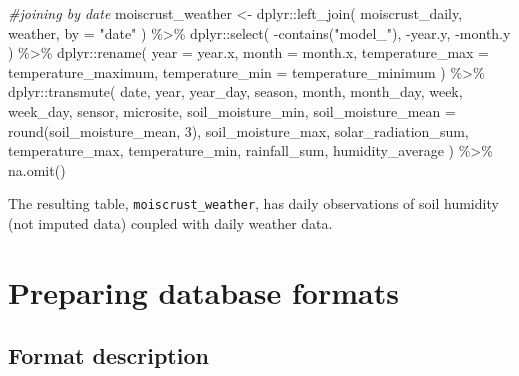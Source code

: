 \documentclass[
  table]{article}
\newenvironment{Shaded}{\begin{snugshade}}{\end{snugshade}}
\newcommand{\AttributeTok}[1]{\textcolor[rgb]{0.77,0.63,0.00}{#1}}
\newcommand{\CommentTok}[1]{\textcolor[rgb]{0.56,0.35,0.01}{\textit{#1}}}
\newcommand{\DecValTok}[1]{\textcolor[rgb]{0.00,0.00,0.81}{#1}}
\newcommand{\FunctionTok}[1]{\textcolor[rgb]{0.00,0.00,0.00}{#1}}
\newcommand{\NormalTok}[1]{#1}
\newcommand{\OtherTok}[1]{\textcolor[rgb]{0.56,0.35,0.01}{#1}}
\newcommand{\SpecialCharTok}[1]{\textcolor[rgb]{0.00,0.00,0.00}{#1}}
\newcommand{\StringTok}[1]{\textcolor[rgb]{0.31,0.60,0.02}{#1}}
\begin{document}
\begin{Shaded}
\begin{Highlighting}[]
\CommentTok{\#joining by date}
\NormalTok{moiscrust\_weather }\OtherTok{\textless{}{-}}\NormalTok{ dplyr}\SpecialCharTok{::}\FunctionTok{left\_join}\NormalTok{(}
\NormalTok{  moiscrust\_daily,}
\NormalTok{  weather,}
  \AttributeTok{by =} \StringTok{"date"}
\NormalTok{) }\SpecialCharTok{\%\textgreater{}\%} 
\NormalTok{  dplyr}\SpecialCharTok{::}\FunctionTok{select}\NormalTok{(}
    \SpecialCharTok{{-}}\FunctionTok{contains}\NormalTok{(}\StringTok{"model\_"}\NormalTok{),}
    \SpecialCharTok{{-}}\NormalTok{year.y,}
    \SpecialCharTok{{-}}\NormalTok{month.y}
\NormalTok{    ) }\SpecialCharTok{\%\textgreater{}\%} 
\NormalTok{  dplyr}\SpecialCharTok{::}\FunctionTok{rename}\NormalTok{(}
    \AttributeTok{year =}\NormalTok{ year.x,}
    \AttributeTok{month =}\NormalTok{ month.x,}
    \AttributeTok{temperature\_max =}\NormalTok{ temperature\_maximum,}
    \AttributeTok{temperature\_min =}\NormalTok{ temperature\_minimum}
\NormalTok{  ) }\SpecialCharTok{\%\textgreater{}\%} 
\NormalTok{  dplyr}\SpecialCharTok{::}\FunctionTok{transmute}\NormalTok{(}
\NormalTok{    date,}
\NormalTok{    year,}
\NormalTok{    year\_day,}
\NormalTok{    season,}
\NormalTok{    month,}
\NormalTok{    month\_day,}
\NormalTok{    week,}
\NormalTok{    week\_day,}
\NormalTok{    sensor,}
\NormalTok{    microsite,}
\NormalTok{    soil\_moisture\_min,}
    \AttributeTok{soil\_moisture\_mean =} \FunctionTok{round}\NormalTok{(soil\_moisture\_mean, }\DecValTok{3}\NormalTok{),}
\NormalTok{    soil\_moisture\_max,}
\NormalTok{    solar\_radiation\_sum,}
\NormalTok{    temperature\_max,}
\NormalTok{    temperature\_min,}
\NormalTok{    rainfall\_sum,}
\NormalTok{    humidity\_average}
\NormalTok{  ) }\SpecialCharTok{\%\textgreater{}\%} 
  \FunctionTok{na.omit}\NormalTok{()}
\end{Highlighting}
\end{Shaded}

The resulting table, \texttt{moiscrust\_weather}, has daily observations
of soil humidity (not imputed data) coupled with daily weather data.

\hypertarget{preparing-database-formats}{%
\section{Preparing database formats}\label{preparing-database-formats}}

\hypertarget{format-description}{%
\subsection{Format description}\label{format-description}}
\end{document}
